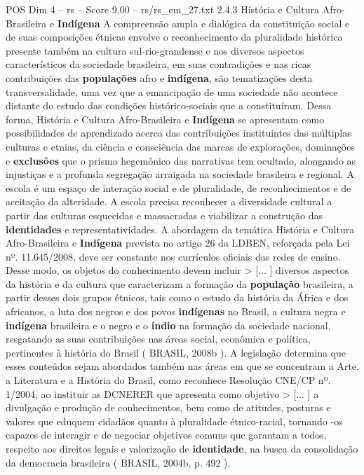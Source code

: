 \begin{textsample}{POS Dim 4 – rs – Score 9.00 – rs/rs\_em\_27.txt}  \label{ex:f4_pos_095}
2.4.3 História e Cultura Afro-Brasileira e \textbf{Indígena} A compreensão ampla e dialógica da constituição social e de suas composições étnicas envolve o reconhecimento da pluralidade histórica presente também na cultura sul-rio-grandense e nos diversos aspectos característicos da sociedade brasileira, em suas contradições e nas ricas contribuições das \textbf{populações} afro e \textbf{indígena}, são tematizações desta transversalidade, uma vez que a emancipação de uma sociedade não acontece distante do estudo das condições histórico-sociais que a constituíram.
Dessa forma, História e Cultura Afro-Brasileira e \textbf{Indígena} se apresentam como possibilidades de aprendizado acerca das contribuições instituintes das múltiplas culturas e etnias, da ciência e consciência das marcas de explorações, dominações e \textbf{exclusões} que o prisma hegemônico das narrativas tem ocultado, alongando as injustiças e a profunda segregação arraigada na sociedade brasileira e regional.
A escola é um espaço de interação social e de pluralidade, de reconhecimentos e de aceitação da alteridade.
A escola precisa reconhecer a diversidade cultural a partir das culturas esquecidas e massacradas e viabilizar a construção das \textbf{identidades} e representatividades.
A abordagem da temática História e Cultura Afro-Brasileira e \textbf{Indígena} prevista no artigo 26 da LDBEN, reforçada pela Lei nº. 11.645/2008, deve ser constante nos currículos oficiais das redes de ensino.
Desse modo, os objetos do conhecimento devem incluir > [... ] diversos aspectos da história e da cultura que caracterizam a formação da \textbf{população} brasileira, a partir desses dois grupos étnicos, tais como o estudo da história da África e dos africanos, a luta dos negros e dos povos \textbf{indígenas} no Brasil, a cultura negra e \textbf{indígena} brasileira e o negro e o \textbf{índio} na formação da sociedade nacional, resgatando as suas contribuições nas áreas social, econômica e política, pertinentes à história do Brasil ( BRASIL, 2008b ).
A legislação determina que esses conteúdos sejam abordados também nas áreas em que se concentram a Arte, a Literatura e a História do Brasil, como reconhece Resolução CNE/CP nº. 1/2004, ao instituir as DCNERER que apresenta como objetivo > [... ] a divulgação e produção de conhecimentos, bem como de atitudes, posturas e valores que eduquem cidadãos quanto à pluralidade étnico-racial, tornando -os capazes de interagir e de negociar objetivos comuns que garantam a todos, respeito aos direitos legais e valorização de \textbf{identidade}, na busca da consolidação da democracia brasileira ( BRASIL, 2004b, p. 492 ).

\end{textsample}
